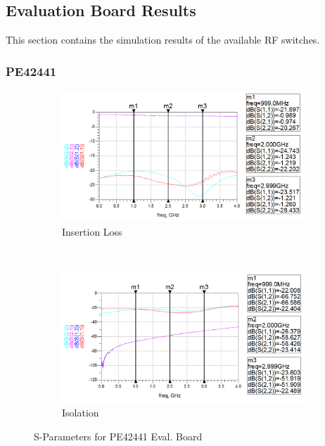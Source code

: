 \documentclass[12pt,openany,a4paper]{book}
\begin{document}
\subsection{Evaluation Board Results}
This section contains the simulation results of the available RF switches.

\subsubsection{PE42441}
\begin{figure}[H]
    \centering
    \begin{subfigure}[t]{0.5\textwidth}
        \centering
        \includegraphics[width=1\textwidth]{eval-pe42441.png}
        \caption{Insertion Loss}
        \label{fig:eval-pe42441}
    \end{subfigure}%
    ~ 
    \begin{subfigure}[t]{0.5\textwidth}
        \centering
        \includegraphics[width=1\textwidth]{eval-pe42441-closed.png}
        \caption{Isolation}
    \end{subfigure}
    \caption{S-Parameters for PE42441 Eval. Board}
\end{figure}
\end{document}
